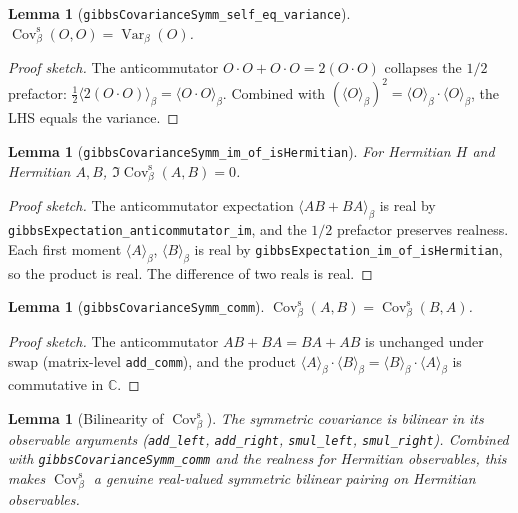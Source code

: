 \documentclass[a4paper,11pt]{article}
\newtheorem{lemma}[theorem]{Lemma}
\begin{document}
\begin{lemma}[\texttt{gibbsCovarianceSymm\_self\_eq\_variance}]
$\operatorname{Cov}^{\mathrm{s}}_\beta(O, O) = \operatorname{Var}_\beta(O)$.
\end{lemma}

\begin{proof}[Proof sketch]
The anticommutator $O \cdot O + O \cdot O = 2 (O \cdot O)$ collapses
the $1/2$ prefactor: $\tfrac{1}{2} \langle 2 (O \cdot O) \rangle_\beta
= \langle O \cdot O \rangle_\beta$.  Combined with
$(\langle O \rangle_\beta)^2 = \langle O \rangle_\beta \cdot \langle O \rangle_\beta$,
the LHS equals the variance.
\end{proof}

\begin{lemma}[\texttt{gibbsCovarianceSymm\_im\_of\_isHermitian}]
For Hermitian $H$ and Hermitian $A, B$,
$\Im\operatorname{Cov}^{\mathrm{s}}_\beta(A, B) = 0$.
\end{lemma}

\begin{proof}[Proof sketch]
The anticommutator expectation
$\langle A B + B A \rangle_\beta$ is real by
\texttt{gibbsExpectation\_anticommutator\_im}, and the $1/2$ prefactor
preserves realness.  Each first moment $\langle A \rangle_\beta$,
$\langle B \rangle_\beta$ is real by
\texttt{gibbsExpectation\_im\_of\_isHermitian}, so the product is
real.  The difference of two reals is real.
\end{proof}

\begin{lemma}[\texttt{gibbsCovarianceSymm\_comm}]
$\operatorname{Cov}^{\mathrm{s}}_\beta(A, B) = \operatorname{Cov}^{\mathrm{s}}_\beta(B, A)$.
\end{lemma}

\begin{proof}[Proof sketch]
The anticommutator $A B + B A = B A + A B$ is unchanged under swap
(matrix-level \texttt{add\_comm}), and the product
$\langle A \rangle_\beta \cdot \langle B \rangle_\beta
 = \langle B \rangle_\beta \cdot \langle A \rangle_\beta$
is commutative in $\mathbb{C}$.
\end{proof}

\begin{lemma}[Bilinearity of $\operatorname{Cov}^{\mathrm{s}}_\beta$]
The symmetric covariance is bilinear in its observable arguments
(\texttt{add\_left}, \texttt{add\_right}, \texttt{smul\_left},
\texttt{smul\_right}).  Combined with
\texttt{gibbsCovarianceSymm\_comm} and the realness for Hermitian
observables, this makes $\operatorname{Cov}^{\mathrm{s}}_\beta$ a
genuine real-valued symmetric bilinear pairing on Hermitian
observables.
\end{lemma}
\end{document}
